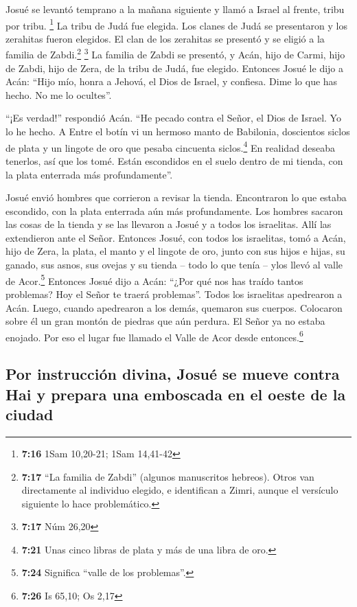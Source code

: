  Josué se levantó temprano a la mañana siguiente y llamó
a Israel al frente, tribu por tribu. \footnote{\textbf{7:16} 1Sam
  10,20-21; 1Sam 14,41-42}  La tribu de Judá fue elegida.
Los clanes de Judá se presentaron y los zerahitas fueron elegidos. El
clan de los zerahitas se presentó y se eligió a la familia de
Zabdi.\footnote{\textbf{7:17} ``La familia de Zabdi'' (algunos
  manuscritos hebreos). Otros van directamente al individuo elegido, e
  identifican a Zimri, aunque el versículo siguiente lo hace
  problemático.} \footnote{\textbf{7:17} Núm 26,20}  La
familia de Zabdi se presentó, y Acán, hijo de Carmi, hijo de Zabdi, hijo
de Zera, de la tribu de Judá, fue elegido.  Entonces
Josué le dijo a Acán: ``Hijo mío, honra a Jehová, el Dios de Israel, y
confiesa. Dime lo que has hecho. No me lo ocultes''.

 ``¡Es verdad!'' respondió Acán. ``He pecado contra el
Señor, el Dios de Israel. Yo lo he hecho.  A Entre el
botín vi un hermoso manto de Babilonia, doscientos siclos de plata y un
lingote de oro que pesaba cincuenta siclos.\footnote{\textbf{7:21} Unas
  cinco libras de plata y más de una libra de oro.} En realidad deseaba
tenerlos, así que los tomé. Están escondidos en el suelo dentro de mi
tienda, con la plata enterrada más profundamente''.

 Josué envió hombres que corrieron a revisar la tienda.
Encontraron lo que estaba escondido, con la plata enterrada aún más
profundamente.  Los hombres sacaron las cosas de la
tienda y se las llevaron a Josué y a todos los israelitas. Allí las
extendieron ante el Señor.  Entonces Josué, con todos los
israelitas, tomó a Acán, hijo de Zera, la plata, el manto y el lingote
de oro, junto con sus hijos e hijas, su ganado, sus asnos, sus ovejas y
su tienda -- todo lo que tenía -- ylos llevó al valle de
Acor.\footnote{\textbf{7:24} Significa ``valle de los problemas''.}
 Entonces Josué dijo a Acán: ``¿Por qué nos has traído
tantos problemas? Hoy el Señor te traerá problemas''. Todos los
israelitas apedrearon a Acán. Luego, cuando apedrearon a los demás,
quemaron sus cuerpos.  Colocaron sobre él un gran montón
de piedras que aún perdura. El Señor ya no estaba enojado. Por eso el
lugar fue llamado el Valle de Acor desde entonces.\footnote{\textbf{7:26}
  Is 65,10; Os 2,17}

\hypertarget{por-instrucciuxf3n-divina-josuuxe9-se-mueve-contra-hai-y-prepara-una-emboscada-en-el-oeste-de-la-ciudad}{%
\subsection{Por instrucción divina, Josué se mueve contra Hai y prepara
una emboscada en el oeste de la
ciudad}\label{por-instrucciuxf3n-divina-josuuxe9-se-mueve-contra-hai-y-prepara-una-emboscada-en-el-oeste-de-la-ciudad}}

